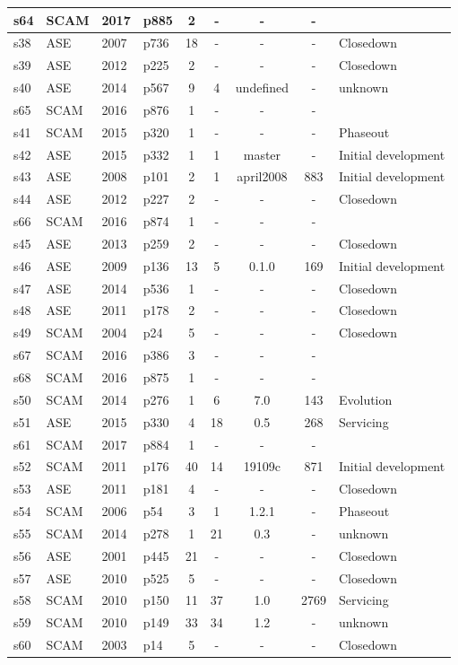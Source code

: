 \begin{longtable}{| l | l | l | l | c | c | c | c | l |}
    \hline
s64 & SCAM & 2017 & p885 & 2 & - & - & - &  \\
    \hline
s38 & ASE & 2007 & p736 & 18 & - & - & - & Closedown \\
    \hline
s39 & ASE & 2012 & p225 & 2 & - & - & - & Closedown \\
    \hline
s40 & ASE & 2014 & p567 & 9 & 4 & undefined & - & unknown \\
    \hline
s65 & SCAM & 2016 & p876 & 1 & - & - & - &  \\
    \hline
s41 & SCAM & 2015 & p320 & 1 & - & - & - & Phaseout \\
    \hline
s42 & ASE & 2015 & p332 & 1 & 1 & master & - & Initial development \\
    \hline
s43 & ASE & 2008 & p101 & 2 & 1 & april2008 & 883 & Initial development \\
    \hline
s44 & ASE & 2012 & p227 & 2 & - & - & - & Closedown \\
    \hline
s66 & SCAM & 2016 & p874 & 1 & - & - & - &  \\
    \hline
s45 & ASE & 2013 & p259 & 2 & - & - & - & Closedown \\
    \hline
s46 & ASE & 2009 & p136 & 13 & 5 & 0.1.0 & 169 & Initial development \\
    \hline
s47 & ASE & 2014 & p536 & 1 & - & - & - & Closedown \\
    \hline
s48 & ASE & 2011 & p178 & 2 & - & - & - & Closedown \\
    \hline
s49 & SCAM & 2004 & p24 & 5 & - & - & - & Closedown \\
    \hline
s67 & SCAM & 2016 & p386 & 3 & - & - & - &  \\
    \hline
s68 & SCAM & 2016 & p875 & 1 & - & - & - &  \\
    \hline
s50 & SCAM & 2014 & p276 & 1 & 6 & 7.0 & 143 & Evolution \\
    \hline
s51 & ASE & 2015 & p330 & 4 & 18 & 0.5 & 268 & Servicing \\
    \hline
s61 & SCAM & 2017 & p884 & 1 & - & - & - &  \\
    \hline
s52 & SCAM & 2011 & p176 & 40 & 14 & 19109c & 871 & Initial development \\
    \hline
s53 & ASE & 2011 & p181 & 4 & - & - & - & Closedown \\
    \hline
s54 & SCAM & 2006 & p54 & 3 & 1 & 1.2.1 & - & Phaseout \\
    \hline
s55 & SCAM & 2014 & p278 & 1 & 21 & 0.3 & - & unknown \\
    \hline
s56 & ASE & 2001 & p445 & 21 & - & - & - & Closedown \\
    \hline
s57 & ASE & 2010 & p525 & 5 & - & - & - & Closedown \\
    \hline
s58 & SCAM & 2010 & p150 & 11 & 37 & 1.0 & 2769 & Servicing \\
    \hline
s59 & SCAM & 2010 & p149 & 33 & 34 & 1.2 & - & unknown \\
    \hline
s60 & SCAM & 2003 & p14 & 5 & - & - & - & Closedown \\
    \hline
  \hline
\end{longtable}
